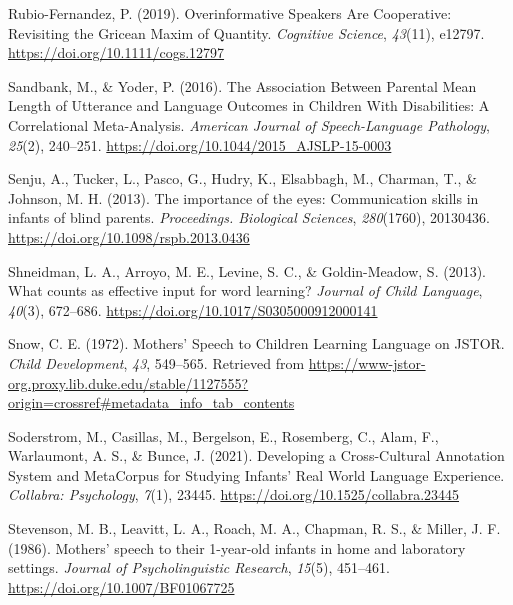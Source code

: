 \documentclass[
  man]{apa6}
\newlength{\cslhangindent}
\newlength{\cslentryspacingunit} %
\newenvironment{CSLReferences}[2] %
 {%
  \setlength{\parindent}{0pt}
  \ifodd #1
  \let\oldpar\par
  \def\par{\hangindent=\cslhangindent\oldpar}
  \fi
  \setlength{\parskip}{#2\cslentryspacingunit}
 }%
 {}
\begin{document}
\begin{CSLReferences}{1}{0}
\leavevmode{}%
Rubio-Fernandez, P. (2019). Overinformative {Speakers} {Are} {Cooperative}: {Revisiting} the {Gricean} {Maxim} of {Quantity}. \emph{Cognitive Science}, \emph{43}(11), e12797. \url{https://doi.org/10.1111/cogs.12797}

\leavevmode{}%
Sandbank, M., \& Yoder, P. (2016). The {Association} {Between} {Parental} {Mean} {Length} of {Utterance} and {Language} {Outcomes} in {Children} {With} {Disabilities}: {A} {Correlational} {Meta}-{Analysis}. \emph{American Journal of Speech-Language Pathology}, \emph{25}(2), 240--251. \url{https://doi.org/10.1044/2015_AJSLP-15-0003}

\leavevmode{}%
Senju, A., Tucker, L., Pasco, G., Hudry, K., Elsabbagh, M., Charman, T., \& Johnson, M. H. (2013). The importance of the eyes: Communication skills in infants of blind parents. \emph{Proceedings. Biological Sciences}, \emph{280}(1760), 20130436. \url{https://doi.org/10.1098/rspb.2013.0436}

\leavevmode{}%
Shneidman, L. A., Arroyo, M. E., Levine, S. C., \& Goldin-Meadow, S. (2013). What counts as effective input for word learning? \emph{Journal of Child Language}, \emph{40}(3), 672--686. \url{https://doi.org/10.1017/S0305000912000141}

\leavevmode{}%
Snow, C. E. (1972). Mothers' {Speech} to {Children} {Learning} {Language} on {JSTOR}. \emph{Child Development}, \emph{43}, 549--565. Retrieved from \url{https://www-jstor-org.proxy.lib.duke.edu/stable/1127555?origin=crossref\#metadata_info_tab_contents}

\leavevmode{}%
Soderstrom, M., Casillas, M., Bergelson, E., Rosemberg, C., Alam, F., Warlaumont, A. S., \& Bunce, J. (2021). Developing a {Cross}-{Cultural} {Annotation} {System} and {MetaCorpus} for {Studying} {Infants}' {Real} {World} {Language} {Experience}. \emph{Collabra: Psychology}, \emph{7}(1), 23445. \url{https://doi.org/10.1525/collabra.23445}

\leavevmode{}%
Stevenson, M. B., Leavitt, L. A., Roach, M. A., Chapman, R. S., \& Miller, J. F. (1986). Mothers' speech to their 1-year-old infants in home and laboratory settings. \emph{Journal of Psycholinguistic Research}, \emph{15}(5), 451--461. \url{https://doi.org/10.1007/BF01067725}


\end{CSLReferences}
\end{document}
